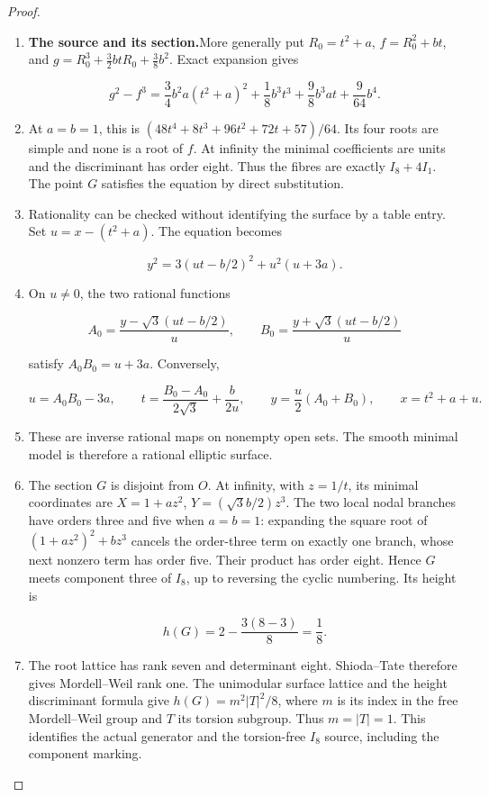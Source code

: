 \begin{proof}
\begin{enumerate}[label=\arabic*.]
\item \par\medskip\noindent\textbf{The source and its section.}\enspace More generally put
\(R_0=t^2+a\),
\(f=R_0^2+bt\), and
\(g=R_0^3+\frac32btR_0+\frac38b^2\).  Exact expansion gives

\[
 g^2-f^3=
 \frac34b^2a(t^2+a)^2+
 \frac18b^3t^3+\frac98b^3at+\frac9{64}b^4.
\]

\item At \(a=b=1\), this is
\((48t^4+8t^3+96t^2+72t+57)/64\).  Its four roots are simple
and none is a root of \(f\).  At infinity the minimal coefficients
are units and the discriminant has order eight.  Thus the fibres
are exactly \(I_8+4I_1\).  The point \(G\) satisfies the equation
by direct substitution.

\item Rationality can be checked without identifying the surface by a
table entry.  Set \(u=x-(t^2+a)\).  The equation becomes

\[
 y^2=3(ut-b/2)^2+u^2(u+3a).
\]

\item On \(u\ne0\), the two rational functions

\[
 A_0=\frac{y-\sqrt3(ut-b/2)}u,
 \qquad B_0=\frac{y+\sqrt3(ut-b/2)}u
\]

satisfy \(A_0B_0=u+3a\).  Conversely,

\[
 u=A_0B_0-3a,\qquad
 t=\frac{B_0-A_0}{2\sqrt3}+\frac b{2u},\qquad
 y=\frac u2(A_0+B_0),\qquad x=t^2+a+u.
\]

\item These are inverse rational maps on nonempty open sets.  The smooth
minimal model is therefore a rational elliptic surface.

\item The section \(G\) is disjoint from \(O\).  At infinity, with
\(z=1/t\), its minimal coordinates are
\(X=1+az^2\), \(Y=(\sqrt3b/2)z^3\).
The two local nodal branches have orders three and five when
\(a=b=1\): expanding the square root of
\((1+az^2)^2+bz^3\) cancels the order-three term on exactly
one branch, whose next nonzero term has order five.  Their product
has order eight.  Hence \(G\) meets component three of \(I_8\),
up to reversing the cyclic numbering.  Its height is

\[
 h(G)=2-\frac{3(8-3)}8=\frac18.
\]

\item The root lattice has rank seven and determinant eight.  Shioda--Tate
therefore gives Mordell--Weil rank one.  The unimodular surface
lattice and the height discriminant formula give
\(h(G)=m^2|T|^2/8\), where \(m\) is its index in the free
Mordell--Weil group and \(T\) its torsion subgroup.  Thus
\(m=|T|=1\).  This identifies the actual generator and the
torsion-free \(I_8\) source, including the component marking.


\end{enumerate}
\end{proof}
